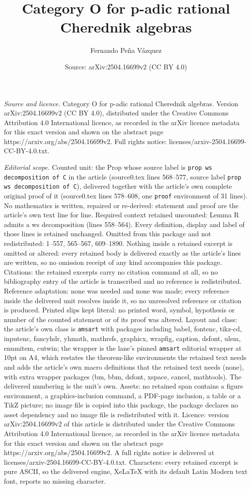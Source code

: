 \documentclass[10pt,a4paper]{amsart}
\title[Category O for p-adic rational Cherednik algebras]{Category O for p-adic rational Cherednik algebras}
\author{Fernando Pe\~na V\'azquez}
\date{Source: arXiv:2504.16699v2 (CC BY 4.0)}
\begin{document}
\maketitle

\noindent\emph{Source and licence.} Category O for p-adic rational Cherednik algebras. Version arXiv:2504.16699v2 (CC BY 4.0), distributed under the Creative Commons Attribution 4.0 International licence, as recorded in the arXiv licence metadata for this exact version and shown on the abstract page https://arxiv.org/abs/2504.16699v2. Full rights notice: licenses/arxiv-2504.16699-CC-BY-4.0.txt.\par\smallskip

\noindent\textit{Editorial scope.} Counted unit: the Prop whose source label is \texttt{prop ws decomposition of C} in the article (source0.tex lines 568--577, source label \texttt{prop ws decomposition of C}), delivered together with the article's own complete original proof of it (source0.tex lines 578--608, one \texttt{proof} environment of 31 lines). No mathematics is written, repaired or re-derived: statement and proof are the article's own text line for line. Required context retained uncounted: Lemma R admits a ws decomposition (lines 558--564). Every definition, display and label of those lines is retained unchanged. Omitted from this package and not redistributed: 1--557, 565--567, 609--1890. Nothing inside a retained excerpt is omitted or altered: every retained body is delivered exactly as the article's lines are written, so no omission receipt of any kind accompanies this package. Citations: the retained excerpts carry no citation command at all, so no bibliography entry of the article is transcribed and no reference is redistributed. Reference adaptation: none was needed and none was made; every reference inside the delivered unit resolves inside it, so no unresolved reference or citation is produced. Printed slips kept literal: no printed word, symbol, hypothesis or number of the counted statement or of its proof was altered. Layout and class: the article's own class is \texttt{amsart} with packages including babel, fontenc, tikz-cd, inputenc, fancyhdr, yhmath, mathrsfs, graphicx, wrapfig, caption, dsfont, ulem, enumitem, cutwin; the wrapper is the lane's pinned \texttt{amsart} editorial wrapper at 10pt on A4, which restates the theorem-like environments the retained text needs and adds the article's own macro definitions that the retained text needs (none), with extra wrapper packages (bm, bbm, dsfont, xspace, cancel, mathtools). The delivered numbering is the unit's own. Assets: no retained span contains a figure environment, a graphics-inclusion command, a PDF-page inclusion, a table or a TikZ picture; no image file is copied into this package, the package declares no asset dependency and no image file is redistributed with it. Licence: version arXiv:2504.16699v2 of this article is distributed under the Creative Commons Attribution 4.0 International licence, as recorded in the arXiv licence metadata for this exact version and shown on the abstract page https://arxiv.org/abs/2504.16699v2. A full rights notice is delivered at licenses/arxiv-2504.16699-CC-BY-4.0.txt. Characters: every retained excerpt is pure ASCII, so the delivered engine, XeLaTeX with its default Latin Modern text font, reports no missing character.
\end{document}
